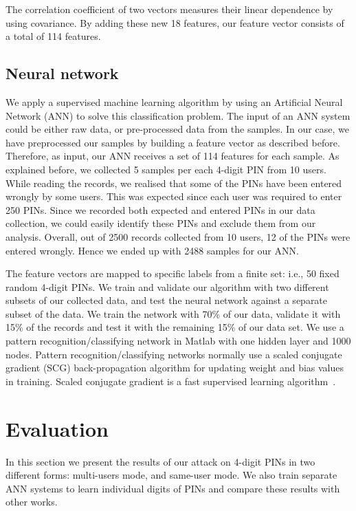 \documentclass[10pt,twocolumn]{article}
\begin{document}
The correlation coefficient of two vectors measures their linear dependence by using  covariance.  
By adding these new 18 features, our feature vector consists of a total of 114 features. 

\subsection{Neural network}
We apply a supervised machine learning algorithm by using an Artificial Neural Network (ANN) to solve this classification problem. 
The input of an ANN system could be either raw data, or pre-processed data from the samples. In our case, we have preprocessed our samples by building a feature vector as described before. Therefore, as input, our ANN receives a set of 114 features for each sample.   
As explained before, we collected 5 samples per each 4-digit PIN from 10 users. While reading the records, we realised that some of the PINs have been entered wrongly by some users. This was expected since each user was required to enter 250 PINs. 
Since we recorded both expected and entered PINs in our data collection, we could easily identify these PINs and exclude them from our analysis. Overall, out of 2500 records collected from 10 users, 12 of the PINs were entered wrongly. Hence we ended up with 2488 samples for our ANN. 

The feature vectors are mapped to specific labels from a finite set: i.e., 50 fixed random 4-digit PINs. 
We train and validate our algorithm with two different subsets of our collected data, and test the neural network against a separate subset of the data. 
We train the network with 70\% of our data, validate it with 15\% of the records and test it with the remaining 15\% of our data set. We use a pattern recognition/classifying network in Matlab with one hidden layer and 1000 nodes. 
Pattern recognition/classifying networks normally use a scaled conjugate gradient (SCG) back-propagation algorithm for updating weight and bias values in training. Scaled conjugate gradient is a fast supervised learning algorithm~\cite{ANNbook}. 

\section{Evaluation}
\label{Eva}
In this section we present the results of our attack on 4-digit PINs in two different forms: multi-users mode, and same-user mode. We also train separate ANN systems to learn individual digits of PINs and compare these results with other works.   
\end{document}
